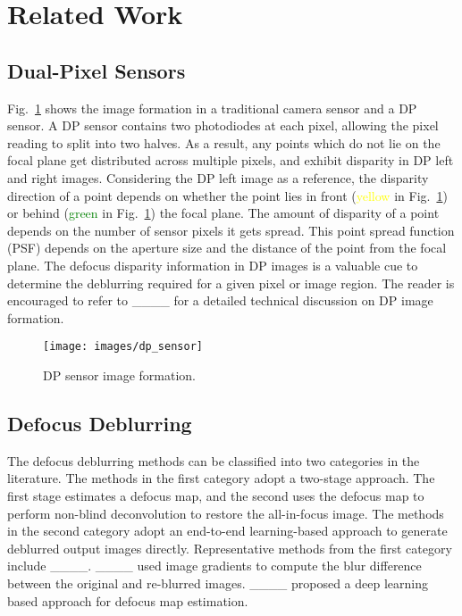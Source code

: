 \section{Related Work}
\label{sec:relatedwork}

\subsection{Dual-Pixel Sensors}
\label{subsec:dualpixelsensor}

Fig.~\ref{fig:dualpixelsensor} shows the image formation in a traditional camera sensor and a DP sensor. A DP sensor contains two photodiodes at each pixel, allowing the pixel reading to split into two halves. As a result, any points which do not lie on the focal plane get distributed across multiple pixels, and exhibit disparity in DP left and right images. Considering the DP left image as a reference, the disparity direction of a point depends on whether the point lies in front (\textcolor{yellow}{yellow} in Fig.~\ref{fig:dualpixelsensor}) or behind (\textcolor{green}{green} in Fig.~\ref{fig:dualpixelsensor}) the focal plane. The amount of disparity of a point depends on the number of sensor pixels it gets spread. This point spread function (PSF) depends on the aperture size and the distance of the point from the focal plane. The defocus disparity information in DP images is a valuable cue to determine the deblurring required for a given pixel or image region. The reader is encouraged to refer to ____ for a detailed technical discussion on DP image formation.

\begin{figure}[t]
	\centering
	\texttt{[image: images/dp\_sensor]}
	\caption{DP sensor image formation.}
	\label{fig:dualpixelsensor}
	\vspace{-14pt}
\end{figure}

\subsection{Defocus Deblurring}
\label{subsec:defocusdeblurmethods}

The defocus deblurring methods can be classified into two categories in the literature. The methods in the first category adopt a two-stage approach. The first stage estimates a defocus map, and the second uses the defocus map to perform non-blind deconvolution to restore the all-in-focus image. The methods in the second category adopt an end-to-end learning-based approach to generate deblurred output images directly. Representative methods from the first category include ____. ____ used image gradients to compute the blur difference between the original and re-blurred images. ____ proposed a deep learning based approach for defocus map estimation.

